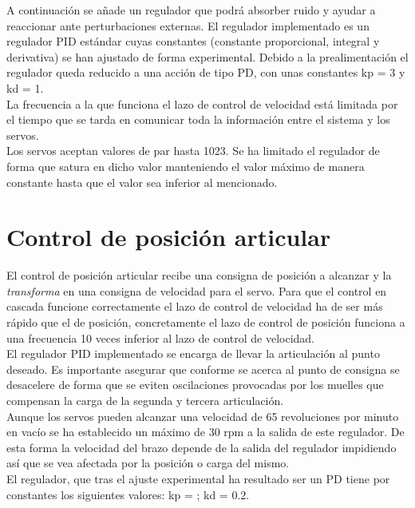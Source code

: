 A continuación se añade un regulador que podrá absorber ruido y ayudar a reaccionar ante perturbaciones externas. El regulador implementado es un regulador PID estándar cuyas constantes (constante proporcional, integral y derivativa) se han ajustado de forma experimental. Debido a la prealimentación el regulador queda reducido a una acción de tipo PD, con unas constantes kp = 3 y kd = 1.
\\

La frecuencia a la que funciona el lazo de control de velocidad está limitada por el tiempo que se tarda en comunicar toda la información entre el sistema y los servos.
\\

Los servos aceptan valores de par hasta 1023. Se ha limitado el regulador  de forma que satura en dicho valor manteniendo el valor máximo de manera constante hasta que el valor sea inferior al mencionado.

\section{Control de posición articular} \label{sec:Contorl:posicion_articular}

El control de posición articular recibe una consigna de posición a alcanzar y la \textit{transforma} en una consigna de velocidad para el servo. Para que el control en cascada funcione correctamente el lazo de control de velocidad ha de ser más rápido que el de posición, concretamente el lazo de control de posición funciona a una frecuencia 10 veces inferior al lazo de control de velocidad.
\\

El regulador PID implementado se encarga de llevar la articulación al punto deseado. Es importante asegurar que conforme se acerca al punto de consigna se desacelere de forma que se eviten oscilaciones provocadas por los muelles que compensan la carga de la segunda y tercera articulación.
\\

Aunque los servos pueden alcanzar una velocidad de 65 revoluciones por minuto en vacío se ha establecido un máximo de 30 rpm a la salida de este regulador. De esta forma la velocidad del brazo depende de la salida del regulador impidiendo así que se vea afectada por la posición o carga del mismo.
\\

El regulador, que tras el ajuste experimental ha resultado ser un PD tiene por constantes los siguientes valores: kp = ; kd = 0.2.